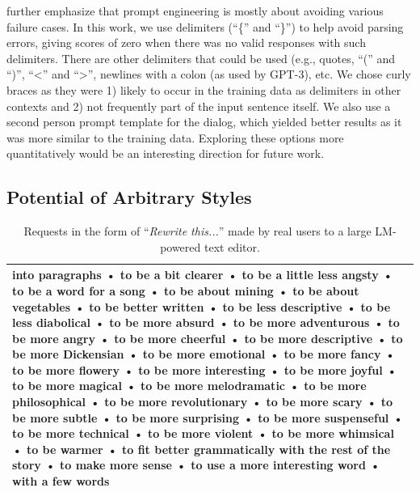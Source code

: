

\citet{reynolds2021prompt} further emphasize that prompt engineering is mostly about avoiding various failure cases.
 In this work, we use delimiters (``\{'' and ``\}'') to help avoid parsing errors, giving scores of zero when there was no valid responses with such delimiters. There are other delimiters that could be used (e.g., quotes, ``('' and ``)'', ``<'' and ``>'', newlines with a colon (as used by GPT-3), etc. We chose curly braces as they were 1) likely to occur in the training data as delimiters in other contexts and 2) not frequently part of the input sentence itself. We also use a second person prompt template for the dialog, which yielded better results as it was more similar to the training data. Exploring these options more quantitatively would be an interesting direction for future work.


\subsection{Potential of Arbitrary Styles}\label{subsec:potential}
 
\begin{table}[t]
\caption{\label{tab:unique_requests}Requests in the form of ``\textit{Rewrite this...}'' made by real users to a large LM-powered text editor.}
\label{tab:realusers}
\small
\def\arraystretch{1.5}%
\begin{tabular}{p{}}
\midrule
into paragraphs • to be a bit clearer • to be a little less angsty • to be a word for a song • to be about mining • to be about vegetables • to be better written • to be less descriptive • to be less diabolical • to be more absurd • to be more adventurous • to be more angry • to be more cheerful • to be more descriptive • to be more Dickensian • to be more emotional • to be more fancy • to be more flowery • to be more interesting • to be more joyful • to be more magical • to be more melodramatic • to be more philosophical • to be more revolutionary • to be more scary • to be more subtle • to be more surprising • to be more suspenseful • to be more technical • to be more violent • to be more whimsical • to be warmer • to fit better grammatically with the rest of the story • to make more sense • to use a more interesting word • with a few words \\
\midrule
\end{tabular}
\end{table}

